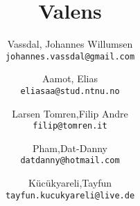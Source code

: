\documentclass[12pt,a4paper]{report}
\title{Valens}
\author{
  Vassdal, Johannes Willumsen\\
  \texttt{johannes.vassdal@gmail.com}
  \and
  Aamot, Elias\\
  \texttt{eliasaa@stud.ntnu.no}
  \and
  Larsen Tomren,Filip Andre\\
  \texttt{filip@tomren.it}
    \and
  Pham,Dat-Danny\\
  \texttt{datdanny@hotmail.com}
    \and
  K\"{u}c\"{u}kyareli,Tayfun\\
  \texttt{tayfun.kucukyareli@live.de}
}
\begin{document}
\onehalfspacing
\maketitle
\tableofcontents



%









\end{document}
